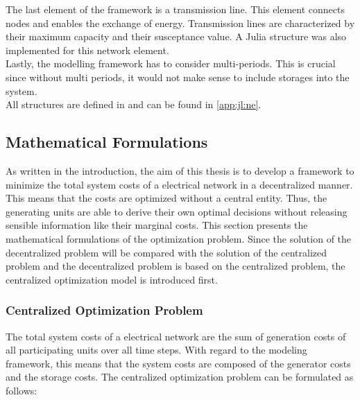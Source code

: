 The last element of the framework is a transmission line. This element connects nodes and enables the exchange of energy. Transmission lines are characterized by their maximum capacity and their susceptance value. A Julia structure was also implemented for this network element.\\

Lastly, the modelling framework has to consider multi-periods. This is crucial since without multi periods, it would not make sense to include storages into the system.\\

All structures are defined in  and can be found in \ref{app:jl:ne}.


\subsection{Mathematical Formulations}
\label{sec:math-form}

As written in the introduction, the aim of this thesis is to develop a framework to minimize the total system costs of a electrical network in a decentralized manner. This means that the costs are optimized without a central entity. Thus, the generating units are able to derive their own optimal decisions without releasing sensible information like their marginal costs. This section presents the mathematical formulations of the optimization problem. Since the solution of the decentralized problem will be compared with the solution of the centralized problem and the decentralized problem is based on the centralized problem, the centralized optimization model is introduced first.

\subsubsection{Centralized Optimization Problem}

The total system costs of a electrical network are the sum of generation costs of all participating units over all time steps. With regard to the modeling framework, this means that the system costs are composed of the generator costs and the storage costs. The centralized optimization problem can be formulated as follows:

